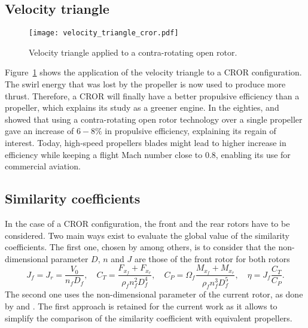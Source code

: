\subsection{Velocity triangle}
\label{sub:cror_velocity_triangle}
\begin{figure}[htp]
  \centering
  \texttt{[image: velocity\_triangle\_cror.pdf]}
  \caption{Velocity triangle applied to a contra-rotating open rotor.}
  \label{fig:velocity_triangle_cror}
\end{figure}
Figure~\ref{fig:velocity_triangle_cror} shows the application
of the velocity triangle to a CROR configuration. The swirl
energy that was lost by the propeller is now used to 
produce more thrust. Therefore, a CROR will finally have a better propulsive
efficiency than a propeller, which explains its study as
a greener engine. In the eighties, 
\citet{Strack1981} and \citet{Hager1988} showed that
using a contra-rotating open rotor technology over
a single propeller gave an increase of $6-8\%$
in propulsive efficiency, explaining its regain of interest.
Today, high-speed propellers blades might lead to higher increase
in efficiency
while keeping a flight Mach number close to $0.8$, enabling its use
for commercial aviation.

\subsection{Similarity coefficients}
\label{sub:cror_similarity_coeff}

In the case of a CROR configuration, the front and the rear rotors 
have to be considered.
Two main ways exist to evaluate the global value of the
similarity coefficients. The first one, chosen by
\citet{Bechet2011} among others, is to consider
that the non-dimensional parameter $D$, $n$ and $J$ are those
of the front rotor for both rotors
\begin{equation}
    J_f = J_r = \frac{V_0}{n_f D_f}, \quad
    C_T = \frac{F_{x_f} + F_{x_r}}{\rho_f n_f ^ 2  D_f ^ 4}, \quad
    C_P = \Omega_f \frac{M_{x_f} + M_{x_r}}{\rho_f n_f ^ 3 D_f ^ 5}, \quad
    \eta = J_f \frac{C_T}{C_P}.
\end{equation} 
The second one uses the non-dimensional parameter of the current rotor,
as done by \citet{Stuermer2008} and \citet{Zachariadis2011}.
The first approach is retained for the current work as it allows
to simplify the comparison of the similarity coefficient with equivalent propellers.
